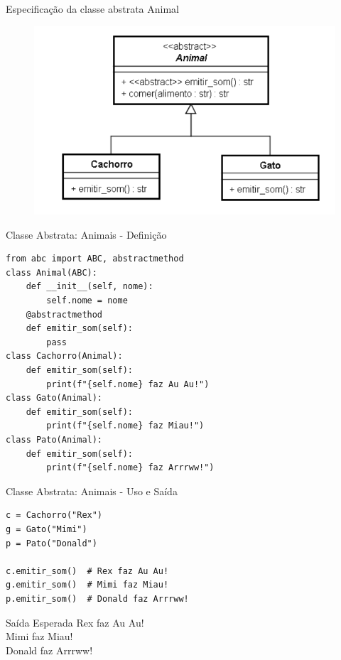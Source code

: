 \begin{frame}{Especificação da classe abstrata Animal}
    \begin{figure}
        \centering
        \includegraphics[width=0.5\linewidth]{Images/classe-abstrata-animal.png}

        \label{fig:placeholder}
    \end{figure}
\end{frame}

\begin{frame}[fragile]{Classe Abstrata: Animais - Definição}
\small
\begin{verbatim}
from abc import ABC, abstractmethod
class Animal(ABC):
    def __init__(self, nome):
        self.nome = nome
    @abstractmethod
    def emitir_som(self):
        pass
class Cachorro(Animal):
    def emitir_som(self):
        print(f"{self.nome} faz Au Au!")
class Gato(Animal):
    def emitir_som(self):
        print(f"{self.nome} faz Miau!")
class Pato(Animal):
    def emitir_som(self):
        print(f"{self.nome} faz Arrrww!")
\end{verbatim}

\end{frame}

\begin{frame}[fragile]{Classe Abstrata: Animais - Uso e Saída}

\begin{verbatim}
c = Cachorro("Rex")
g = Gato("Mimi")
p = Pato("Donald")

c.emitir_som()  # Rex faz Au Au!
g.emitir_som()  # Mimi faz Miau!
p.emitir_som()  # Donald faz Arrrww!
\end{verbatim}

\begin{block}{Saída Esperada}
Rex faz Au Au! \\
Mimi faz Miau! \\
Donald faz Arrrww!
\end{block}

\end{frame}
